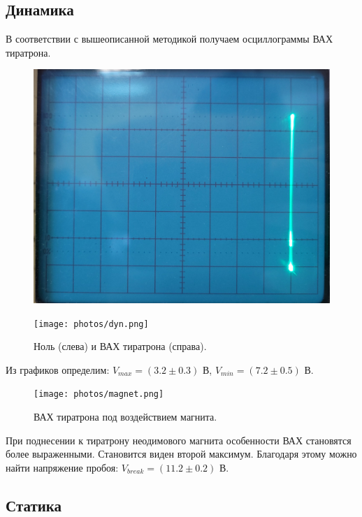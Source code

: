 \documentclass[12pt,a4paper]{article}
\begin{document}
	\subsection*{Динамика}
	
	В соответствии с вышеописанной методикой получаем осциллограммы ВАХ тиратрона.

	\begin{figure}[H]
		\centering
		\begin{minipage}{0.49\textwidth}
			\centering
			\includegraphics[width=0.9\linewidth]{photos/ground.jpg}
		\end{minipage}%
		\begin{minipage}{0.49\textwidth}
			\centering
			\texttt{[image: photos/dyn.png]}
		\end{minipage}
		\caption{Ноль (слева) и ВАХ тиратрона (справа).}
		\label{fig:dynamic}
	\end{figure}
	
	Из графиков определим: $V_{max} = (3.2 \pm 0.3)$ В, $V_{min} = (7.2 \pm 0.5)$ В.
	
	\begin{figure}[H]
		\centering
		\texttt{[image: photos/magnet.png]}
		\caption{ВАХ тиратрона под воздействием магнита.}
		\label{fig:magnet}
	\end{figure}
	
	При поднесении к тиратрону неодимового магнита особенности ВАХ становятся более выраженными. Становится виден второй максимум. Благодаря этому можно найти напряжение пробоя: $V_{break} = (11.2 \pm 0.2)$ В.
	
	\newpage
	\subsection*{Статика}
	
\end{document}
